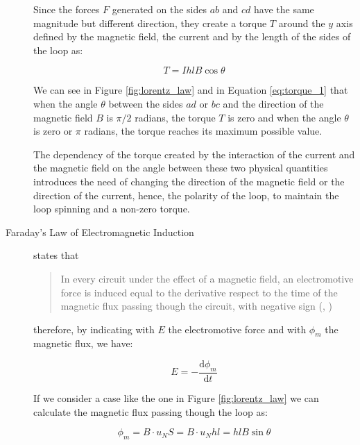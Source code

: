 \begin{description}
Since the forces $F$ generated on the sides $ab$ and $cd$ have the same magnitude but different direction, they create a torque $T$ around the $y$ axis defined by the magnetic field, the current and by the length of the sides of the loop as:

\begin{equation}
	\label{eq:torque_1}
	T = I h l B \cos \theta
\end{equation}

We can see in Figure \ref{fig:lorentz_law} and in Equation \ref{eq:torque_1} that when the angle $\theta$ between the sides $ad$ or $bc$ and the direction of the magnetic field $B$ is $\pi / 2$ radians, the torque $T$ is zero and when the angle $\theta$ is zero or $\pi$ radians, the torque reaches its maximum possible value. 

The dependency of the torque created by the interaction of the current and the magnetic field on the angle between these two physical quantities introduces the need of changing the direction of the magnetic field or the direction of the current, hence, the polarity of the loop, to maintain the loop spinning and a non-zero torque.

\item[Faraday’s Law of Electromagnetic Induction] states that
\blockquote{In every circuit under the effect of a magnetic field, an electromotive force is induced equal to the derivative respect to the time of the magnetic flux passing though the circuit, with negative sign (\citeauthor{emWaves:1968}, \citeyear{emWaves:1968})}.

therefore, by indicating with $E$ the electromotive force and with $\phi _{m}$ the magnetic flux, we have:

\begin{equation}
	\label{eq:em_1}
	E = - \frac{\mathrm{d} \phi _{m}}{\mathrm{d} t}
\end{equation}

If we consider a case like the one in Figure \ref{fig:lorentz_law} we can calculate the magnetic flux passing though the loop as:

\begin{equation}
	\label{eq:mf_1}
	\phi _{m} = B \cdot u_{N} S = B \cdot u_{N} h l = h l B \sin \theta 
\end{equation}


\end{description}
